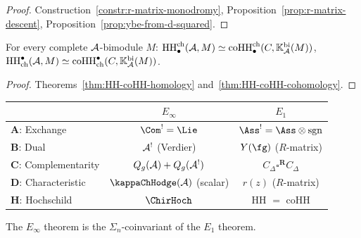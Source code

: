 \begin{proof}
Construction~\ref{constr:r-matrix-monodromy},
Proposition~\ref{prop:r-matrix-descent},
Proposition~\ref{prop:ybe-from-d-squared}.
\end{proof}

\begin{theorem}
\label{thm:e1-theorem-H}
For every complete $\mathcal{A}$-bimodule $M$\textup{:}
$\operatorname{HH}^{\mathrm{ch}}_\bullet(\mathcal{A}, M)
\simeq
\operatorname{coHH}^{\mathrm{ch}}_\bullet(C, \mathbb{K}_{\mathcal{A}}^{\mathrm{bi}}(M))$,\quad
$\operatorname{HH}_{\mathrm{ch}}^\bullet(\mathcal{A}, M)
\simeq
\operatorname{coHH}_{\mathrm{ch}}^\bullet(C, \mathbb{K}_{\mathcal{A}}^{\mathrm{bi}}(M))$.
\end{theorem}

\begin{proof}
Theorems~\ref{thm:HH-coHH-homology}
and~\ref{thm:HH-coHH-cohomology}.
\end{proof}

\begin{remark}[$E_1$ vs $E_\infty$]
\label{rem:e1-einfty-five-comparison}
\begin{center}
\renewcommand{\arraystretch}{1.15}
\begin{tabular}{lcc}
\toprule
& \emph{$E_\infty$} & \emph{$E_1$} \\
\midrule
\textbf{A}: Exchange
 & $\Com^! = \Lie$
 & $\Ass^! = \Ass \otimes \mathrm{sgn}$ \\
\textbf{B}: Dual
 & $\mathcal{A}^!$ (Verdier)
 & $Y(\fg)$ ($R$-matrix) \\
\textbf{C}: Complementarity
 & $Q_g(\mathcal{A}) + Q_g(\mathcal{A}^!)$
 & $C_\Delta \square^{\mathbf{R}} C_\Delta$ \\
\textbf{D}: Characteristic
 & $\kappaChHodge(\cA)$ (scalar)
 & $r(z)$ ($R$-matrix) \\
\textbf{H}: Hochschild
 & $\ChirHoch$
 & HH $=$ coHH \\
\bottomrule
\end{tabular}
\end{center}
The $E_\infty$ theorem is the $\Sigma_n$-coinvariant of the $E_1$ theorem.
\end{remark}

